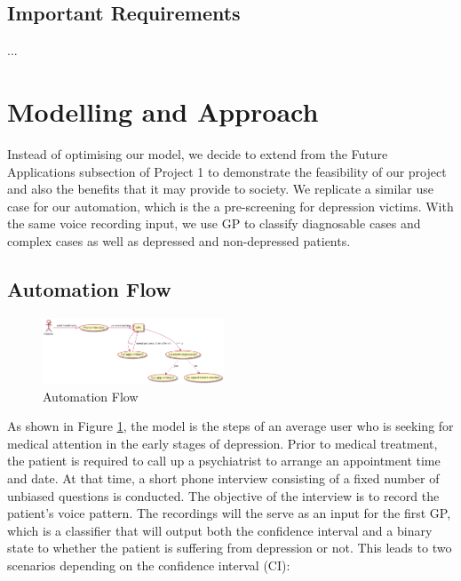 \documentclass{article}
\begin{document}
	\subsection{Important Requirements}
	...
	
	\section{Modelling and Approach}
	Instead of optimising our model, we decide to extend from the Future Applications subsection of Project 1 to demonstrate the feasibility of our project and also the benefits that it may provide to society.
	We replicate a similar use case for our automation, which is the a pre-screening for depression victims.
	With the same voice recording input, we use GP to classify diagnosable cases and complex cases as well as depressed and non-depressed patients. \\	

	\subsection{Automation Flow} \label{af}
	\begin{figure}[h]
 		\begin{center}
		\includegraphics[width=0.48\textwidth]{automation} 
  		\end{center}
  		\caption{Automation Flow}
  		\label{auto_flow} 
 	\end{figure}

	As shown in Figure \ref{auto_flow}, the model is the steps of an average user who is seeking for medical attention in the early stages of depression.
	Prior to medical treatment, the patient is required to call up a psychiatrist to arrange an appointment time and date. 
	At that time, a short phone interview consisting of a fixed number of unbiased questions is conducted.
	The objective of the interview is to record the patient's voice pattern.
	The recordings will the serve as an input for the first GP, which is a classifier that will output both the confidence interval and a binary state to whether the patient is suffering from depression or not.
	This leads to two scenarios depending on the confidence interval (CI):
	
\end{document}
